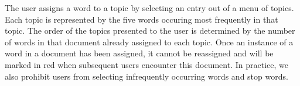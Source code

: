 The user assigns a word to a topic by selecting an entry out of a menu
of topics.  Each topic is represented by the five words occuring most
frequently in that topic.  The order of the topics presented to the
user is determined by the number of words in that document already
assigned to each topic.  Once an instance of a word in a document has
been assigned, it cannot be reassigned and will be marked in red when
subsequent users encounter this document.  In practice, we also
prohibit users from selecting infrequently occurring words and stop
words.


